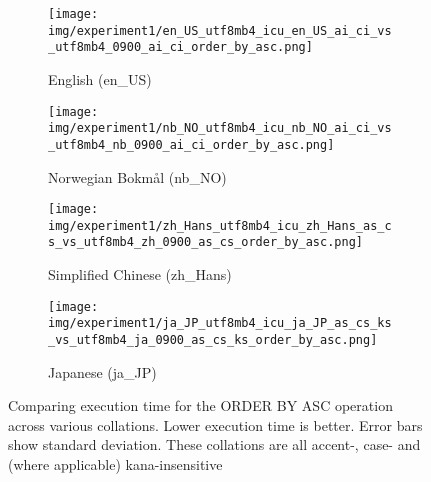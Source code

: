 
    \begin{figure}[htp]
    \centering
    \begin{subfigure}{.45\textwidth}
                \centering
                \texttt{[image: img/experiment1/en\_US\_utf8mb4\_icu\_en\_US\_ai\_ci\_vs\_utf8mb4\_0900\_ai\_ci\_order\_by\_asc.png]}
                \label{fig:experiment1_order_by_asc_en_US_utf8mb4_icu_en_US_ai_ci_vs_utf8mb4_0900_ai_ci_order_by_asc}
                \caption{English (en\_US)}
            \end{subfigure}
    \hfill
    \begin{subfigure}{.45\textwidth}
                \centering
                \texttt{[image: img/experiment1/nb\_NO\_utf8mb4\_icu\_nb\_NO\_ai\_ci\_vs\_utf8mb4\_nb\_0900\_ai\_ci\_order\_by\_asc.png]}
                \label{fig:experiment1_order_by_asc_nb_NO_utf8mb4_icu_nb_NO_ai_ci_vs_utf8mb4_nb_0900_ai_ci_order_by_asc}
                \caption{Norwegian Bokmål (nb\_NO)}
            \end{subfigure}
    \par
    \begin{subfigure}{.45\textwidth}
                \centering
                \texttt{[image: img/experiment1/zh\_Hans\_utf8mb4\_icu\_zh\_Hans\_as\_cs\_vs\_utf8mb4\_zh\_0900\_as\_cs\_order\_by\_asc.png]}
                \label{fig:experiment1_order_by_asc_zh_Hans_utf8mb4_icu_zh_Hans_as_cs_vs_utf8mb4_zh_0900_as_cs_order_by_asc}
                \caption{Simplified Chinese (zh\_Hans)}
            \end{subfigure}
    \hfill
    \begin{subfigure}{.45\textwidth}
                \centering
                \texttt{[image: img/experiment1/ja\_JP\_utf8mb4\_icu\_ja\_JP\_as\_cs\_ks\_vs\_utf8mb4\_ja\_0900\_as\_cs\_ks\_order\_by\_asc.png]}
                \label{fig:experiment1_order_by_asc_ja_JP_utf8mb4_icu_ja_JP_as_cs_ks_vs_utf8mb4_ja_0900_as_cs_ks_order_by_asc}
                \caption{Japanese (ja\_JP)}
            \end{subfigure}
    \caption{Comparing execution time for the ORDER BY ASC operation across various collations. Lower execution time is better. Error bars show standard deviation. These collations are all accent-, case- and (where applicable) kana-insensitive}
    \label{fig:experiment1_order_by_asc}
    \end{figure}
    